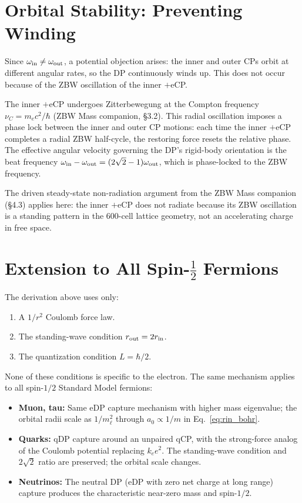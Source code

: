 \documentclass[12pt]{article}
\newcommand{\nuC}{\nu_C}
\newcommand{\rin}{r_{\rm in}}
\newcommand{\rout}{r_{\rm out}}
\newcommand{\oin}{\omega_{\rm in}}
\newcommand{\oout}{\omega_{\rm out}}
\newcommand{\aBohr}{a_0}
\begin{document}
\section{Orbital Stability: Preventing Winding}
\label{sec:stability}

Since $\oin \ne \oout$, a potential objection arises: the inner and
outer CPs orbit at different angular rates, so the DP continuously
winds up.  This does not occur because of the ZBW oscillation of the
inner $+$eCP.

The inner $+$eCP undergoes Zitterbewegung at the Compton frequency
$\nuC = m_e c^2/\hbar$ (ZBW Mass companion, \S3.2).  This radial
oscillation imposes a phase lock between the inner and outer CP
motions: each time the inner $+$eCP completes a radial ZBW half-cycle,
the restoring force resets the relative phase.  The effective angular
velocity governing the DP's rigid-body orientation is the
beat frequency $\oin - \oout = (2\sqrt{2}-1)\oout$, which is
phase-locked to the ZBW frequency.

The driven steady-state non-radiation argument from the ZBW Mass
companion (\S4.3) applies here: the inner $+$eCP does not radiate
because its ZBW oscillation is a standing pattern in the
600-cell lattice geometry, not an accelerating charge in free space.

\section{Extension to All Spin-$\tfrac{1}{2}$ Fermions}
\label{sec:extension}

The derivation above uses only:
\begin{enumerate}[noitemsep]
  \item A $1/r^2$ Coulomb force law.
  \item The standing-wave condition $\rout = 2\rin$.
  \item The quantization condition $L = \hbar/2$.
\end{enumerate}

None of these conditions is specific to the electron.  The same
mechanism applies to all spin-$1/2$ Standard Model fermions:

\begin{itemize}[noitemsep]
  \item \textbf{Muon, tau:} Same eDP capture mechanism with higher
    mass eigenvalue; the orbital radii scale as $1/m_\ell^2$ through
    $\aBohr \propto 1/m$ in Eq.~\eqref{eq:rin_bohr}.
  \item \textbf{Quarks:} qDP capture around an unpaired qCP, with
    the strong-force analog of the Coulomb potential replacing $k_e e^2$.
    The standing-wave condition and $2\sqrt{2}$ ratio are preserved;
    the orbital scale changes.
  \item \textbf{Neutrinos:} The neutral DP (eDP with zero net charge
    at long range) capture produces the characteristic near-zero mass
    and spin-$1/2$.
\end{itemize}
\end{document}
